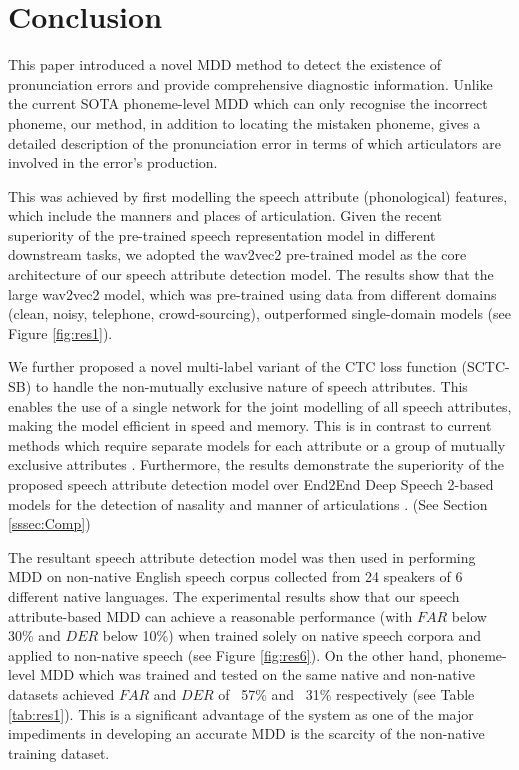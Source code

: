 \documentclass[12pt]{elsarticle}
\begin{document}
\section{Conclusion}
This paper introduced a novel MDD method to detect the existence of pronunciation errors and provide comprehensive diagnostic information. Unlike the current SOTA phoneme-level MDD which can only recognise the incorrect phoneme, our method, in addition to locating the mistaken phoneme, gives a detailed description of the pronunciation error in terms of which articulators are involved in the error’s production.

This was achieved by first modelling the speech attribute (phonological) features, which include the manners and places of articulation. Given the recent superiority of the pre-trained speech representation model in different downstream tasks, we adopted the wav2vec2 pre-trained model as the core architecture of our speech attribute detection model. The results show that the large wav2vec2 model, which was pre-trained using data from different domains (clean, noisy, telephone, crowd-sourcing), outperformed single-domain models (see Figure \ref{fig:res1}). 

We further proposed a novel multi-label variant of the CTC loss function (SCTC-SB) to handle the non-mutually exclusive nature of speech attributes. This enables the use of a single network for the joint modelling of all speech attributes, making the model efficient in speed and memory. This is in contrast to current methods which require separate models for each attribute \cite{RN148, RN149} or a group of mutually exclusive attributes \cite{RN160,RN161}. Furthermore, the results demonstrate the superiority of the proposed speech attribute detection model over End2End Deep Speech 2-based models \cite{RN137} for the detection of nasality \cite{RN162} and manner of articulations \cite{RN169}. (See Section \ref{sssec:Comp})

The resultant speech attribute detection model was then used in performing MDD on non-native English speech corpus collected from 24 speakers of 6 different native languages.  The experimental results show that our speech attribute-based MDD can achieve a reasonable performance (with $FAR$ below 30\% and $DER$ below 10\%) when trained solely on native speech corpora and applied to non-native speech (see Figure \ref{fig:res6}). On the other hand, phoneme-level MDD which was trained and tested on the same native and non-native datasets achieved $FAR$ and $DER$ of ~57\% and ~31\% respectively (see Table \ref{tab:res1}). This is a significant advantage of the system as one of the major impediments in developing an accurate MDD is the scarcity of the non-native training dataset. 
\end{document}
